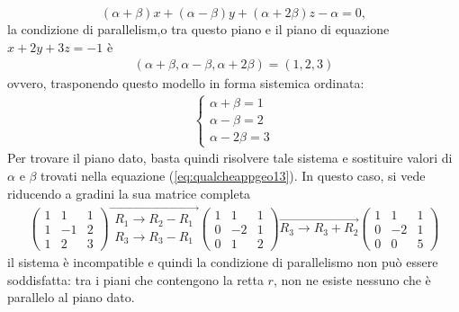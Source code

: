 \begin{es}
  \begin{equation}
    \label{eq:qualcheappgeo13}
    (\alpha+\beta)x+(\alpha-\beta)y+(\alpha+2\beta)z-\alpha = 0,
  \end{equation}
  la condizione di parallelism,o tra questo piano e il piano di equazione $x+2y+3z=-1$ è
  \begin{eqnarray*}
    (\alpha+\beta,\alpha-\beta,\alpha+2\beta)=(1,2,3)
  \end{eqnarray*}
  ovvero, trasponendo questo modello in forma sistemica ordinata:
  \begin{eqnarray*}
    \begin{cases}
      \alpha+\beta=1\\
      \alpha-\beta=2\\
      \alpha-2\beta=3
    \end{cases}
  \end{eqnarray*}
  Per trovare il piano dato, basta quindi risolvere tale sistema e
  sostituire valori di $\alpha$ e $\beta$ trovati nella equazione
  (\ref{eq:qualcheappgeo13}). In questo caso, si vede riducendo a gradini
  la sua matrice completa
  \begin{eqnarray*}
    \left(
    \begin{array}{cc|c}
      1 & 1 & 1 \\
      1&-1&2 \\
      1 & 2 &3
    \end{array}
    \right)\overrightarrow{
    \begin{matrix}
      R_1\to R_2-R_1\\
      R_3\to R_3-R_1
    \end{matrix}
    }\left(
    \begin{array}{cc|c}
      1 & 1 & 1 \\
      0 &-2&1 \\
      0&1&2
    \end{array}
    \right)
    \overrightarrow{R_3\to R_3+R_2}
    \left(
    \begin{array}{cc|c}
      1&1&1 \\
      0&-2&1 \\
      0&0&5
    \end{array}\right)
  \end{eqnarray*}
  il sistema è incompatible e quindi la condizione di parallelismo non
  può essere soddisfatta: tra i piani che contengono la retta $r$, non
  ne esiste nessuno che è parallelo al piano dato.
\end{es}
